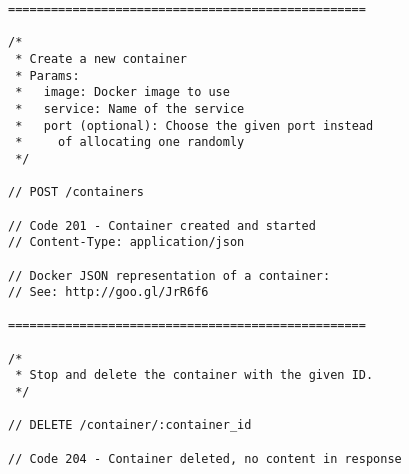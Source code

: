 \begin{lstlisting}
==================================================

/*
 * Create a new container
 * Params:
 *   image: Docker image to use
 *   service: Name of the service
 *   port (optional): Choose the given port instead
 *     of allocating one randomly
 */

// POST /containers

// Code 201 - Container created and started
// Content-Type: application/json

// Docker JSON representation of a container:
// See: http://goo.gl/JrR6f6

==================================================

/*
 * Stop and delete the container with the given ID.
 */

// DELETE /container/:container_id

// Code 204 - Container deleted, no content in response
\end{lstlisting}

